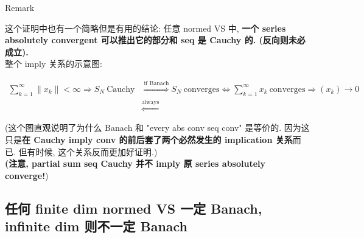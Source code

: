 \begin{qlremark}{Remark}

这个证明中也有一个简略但是有用的结论: 任意 normed VS 中, \textbf{一个 series absolutely convergent 可以推出它的部分和 seq 是 Cauchy 的. (反向则未必成立).}\\
整个 imply 关系的示意图:

\[\begin{matrix}
{\sum\limits_{k = 1}^{\infty} \parallel x_{k} \parallel < \infty\Longrightarrow S_{N}\ \text{Cauchy}} & {\overset{\text{if Banach}}{\Longrightarrow}S_{N}\ \text{converges}\Leftrightarrow\sum\limits_{k = 1}^{\infty}x_{k}\ \text{converges}\Longrightarrow(x_{k})\rightarrow 0} \\
 & \overset{\text{always}}{\Longleftarrow}
\end{matrix}\]

(这个图直观说明了为什么 Banach 和 "every abs conv seq conv" 是等价的. 因为这只是\textbf{在 Cauchy imply conv 的前后套了两个必然发生的 implication 关系}而已. 但有时候, 这个关系反而更加好证明.)\\
\textbf{(注意, partial sum seq Cauchy 并不 imply 原 series absolutely converge!})

\end{qlremark}

\subsection{任何 finite dim normed VS 一定 Banach, infinite dim 则不一定 Banach}\label{ux4efbux4f55-finite-dim-normed-vs-ux4e00ux5b9a-banach-infinite-dim-ux5219ux4e0dux4e00ux5b9a-banach}

